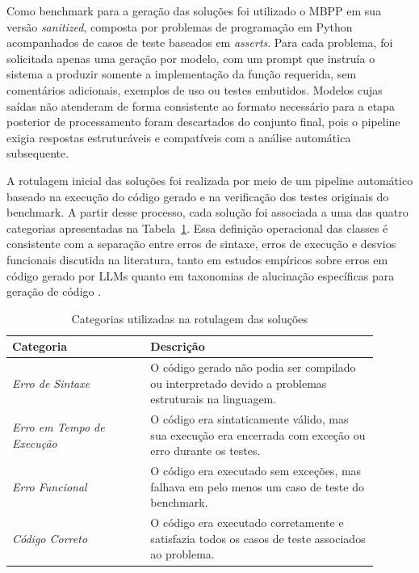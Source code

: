\documentclass[conference]{IEEEtran}
\begin{document}
Como benchmark para a geração das soluções foi utilizado o MBPP em sua versão \textit{sanitized}, composta por problemas de programação em Python acompanhados de casos de teste baseados em \textit{asserts}. Para cada problema, foi solicitada apenas uma geração por modelo, com um prompt que instruía o sistema a produzir somente a implementação da função requerida, sem comentários adicionais, exemplos de uso ou testes embutidos. Modelos cujas saídas não atenderam de forma consistente ao formato necessário para a etapa posterior de processamento foram descartados do conjunto final, pois o pipeline exigia respostas estruturáveis e compatíveis com a análise automática subsequente.

A rotulagem inicial das soluções foi realizada por meio de um pipeline automático baseado na execução do código gerado e na verificação dos testes originais do benchmark. A partir desse processo, cada solução foi associada a uma das quatro categorias apresentadas na Tabela~\ref{tab:categorias_rotulagem}. Essa definição operacional das classes é consistente com a separação entre erros de sintaxe, erros de execução e desvios funcionais discutida na literatura, tanto em estudos empíricos sobre erros em código gerado por LLMs \cite{2407.06153} quanto em taxonomias de alucinação específicas para geração de código \cite{2504.20799}.

\begin{table}[!htbp]
    \centering
    \caption{Categorias utilizadas na rotulagem das soluções}
    \label{tab:categorias_rotulagem}

    \small
    \begin{tabular}{p{0.34\linewidth} p{0.56\linewidth}}
        \toprule
        \textbf{Categoria} & \textbf{Descrição} \\
        \midrule
        \emph{Erro de Sintaxe} &
        O código gerado não podia ser compilado ou interpretado devido a problemas estruturais na linguagem. \\

        \emph{Erro em Tempo de Execução} &
        O código era sintaticamente válido, mas sua execução era encerrada com exceção ou erro durante os testes. \\

        \emph{Erro Funcional} &
        O código era executado sem exceções, mas falhava em pelo menos um caso de teste do benchmark. \\

        \emph{Código Correto} &
        O código era executado corretamente e satisfazia todos os casos de teste associados ao problema. \\
        \bottomrule
    \end{tabular}
\end{table}
\end{document}
